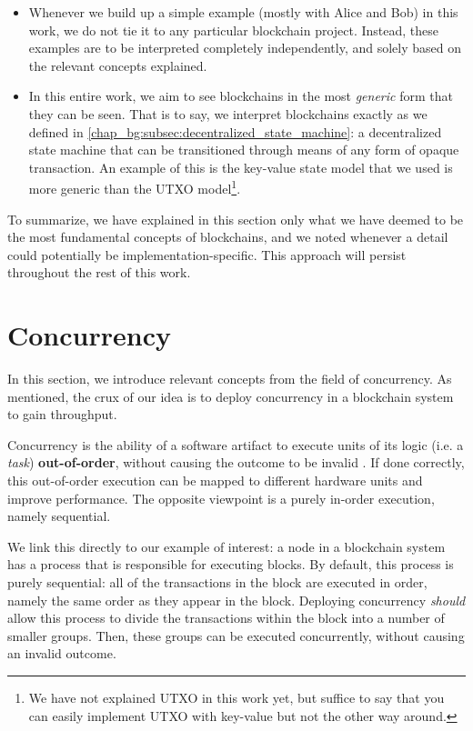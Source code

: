 \begin{itemize}
	\item Whenever we build up a simple example (mostly with Alice and Bob) in this work, we do not
	tie it to any particular blockchain project. Instead, these examples are to be interpreted
	completely independently, and solely based on the relevant concepts explained.
	\item In this entire work, we aim to see blockchains in the most \textit{generic} form that they
	can be seen. That is to say, we interpret blockchains exactly as we defined in
	\ref{chap_bg:subsec:decentralized_state_machine}: a decentralized state machine that can be
	transitioned through means of any form of opaque transaction. An example of this is the
	key-value state model that we used is more generic than the UTXO model\footnote{We have not
	explained UTXO in this work yet, but suffice to say that you can easily implement UTXO with
	key-value but not the other way around.}.
	\end{itemize}

To summarize, we have explained in this section only what we have deemed to be the most fundamental
concepts of blockchains, and we noted whenever a detail could potentially be
implementation-specific. This approach will persist throughout the rest of this work.

\section{Concurrency} \label{chap_bg:sec:concurrency}

In this section, we introduce relevant concepts from the field of concurrency. As mentioned, the
crux of our idea is to deploy concurrency in a blockchain system to gain throughput.

Concurrency is the ability of a software artifact to execute units of its logic (i.e. a
\textit{task}) \textbf{out-of-order}, without causing the outcome to be invalid
\cite{lamportTimeClocksOrdering1978}. If done correctly, this out-of-order execution can be mapped
to different hardware units and improve performance. The opposite viewpoint is a purely in-order
execution, namely sequential.

We link this directly to our example of interest: a node in a blockchain system has a process that
is responsible for executing blocks. By default, this process is purely sequential: all of the
transactions in the block are executed in order, namely the same order as they appear in the block.
Deploying concurrency \textit{should} allow this process to divide the transactions within the block
into a number of smaller groups. Then, these groups can be executed concurrently, without causing an
invalid outcome.

